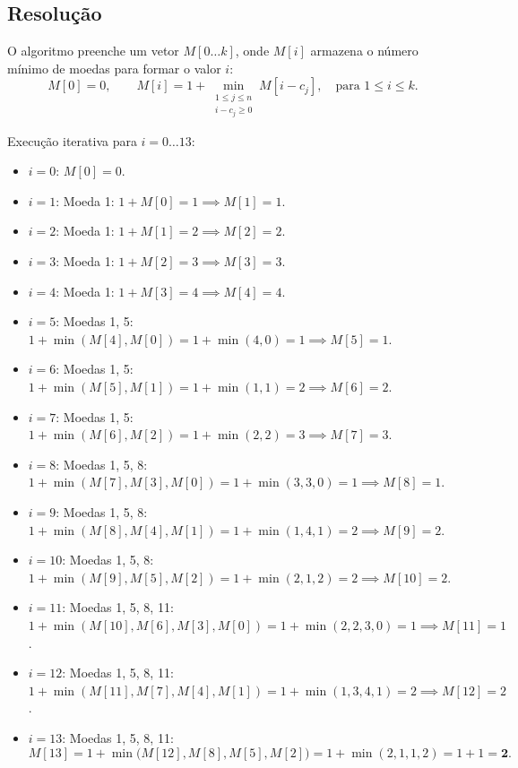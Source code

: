 \documentclass[11pt,a4paper]{article}
\begin{document}
\subsection*{Resolução}

O algoritmo preenche um vetor $M[0 \dots k]$, onde $M[i]$ armazena o número mínimo de moedas para formar o valor $i$:
\begin{equation}
M[0] = 0, \qquad M[i] = 1 + \min_{\substack{1 \le j \le n \\ i - c_j \ge 0}} M[i - c_j], \quad \text{para } 1 \le i \le k.
\end{equation}

Execução iterativa para $i = 0 \dots 13$:
\begin{itemize}
    \item $i = 0$: $M[0] = 0$.
    \item $i = 1$: Moeda 1: $1 + M[0] = 1 \implies M[1] = 1$.
    \item $i = 2$: Moeda 1: $1 + M[1] = 2 \implies M[2] = 2$.
    \item $i = 3$: Moeda 1: $1 + M[2] = 3 \implies M[3] = 3$.
    \item $i = 4$: Moeda 1: $1 + M[3] = 4 \implies M[4] = 4$.
    \item $i = 5$: Moedas 1, 5: $1 + \min(M[4], M[0]) = 1 + \min(4, 0) = 1 \implies M[5] = 1$.
    \item $i = 6$: Moedas 1, 5: $1 + \min(M[5], M[1]) = 1 + \min(1, 1) = 2 \implies M[6] = 2$.
    \item $i = 7$: Moedas 1, 5: $1 + \min(M[6], M[2]) = 1 + \min(2, 2) = 3 \implies M[7] = 3$.
    \item $i = 8$: Moedas 1, 5, 8: $1 + \min(M[7], M[3], M[0]) = 1 + \min(3, 3, 0) = 1 \implies M[8] = 1$.
    \item $i = 9$: Moedas 1, 5, 8: $1 + \min(M[8], M[4], M[1]) = 1 + \min(1, 4, 1) = 2 \implies M[9] = 2$.
    \item $i = 10$: Moedas 1, 5, 8: $1 + \min(M[9], M[5], M[2]) = 1 + \min(2, 1, 2) = 2 \implies M[10] = 2$.
    \item $i = 11$: Moedas 1, 5, 8, 11: $1 + \min(M[10], M[6], M[3], M[0]) = 1 + \min(2, 2, 3, 0) = 1 \implies M[11] = 1$.
    \item $i = 12$: Moedas 1, 5, 8, 11: $1 + \min(M[11], M[7], M[4], M[1]) = 1 + \min(1, 3, 4, 1) = 2 \implies M[12] = 2$.
    \item $i = 13$: Moedas 1, 5, 8, 11:
    \[
    M[13] = 1 + \min\big( M[12], M[8], M[5], M[2] \big) = 1 + \min(2, 1, 1, 2) = 1 + 1 = \mathbf{2}.
    \]
\end{itemize}
\end{document}
